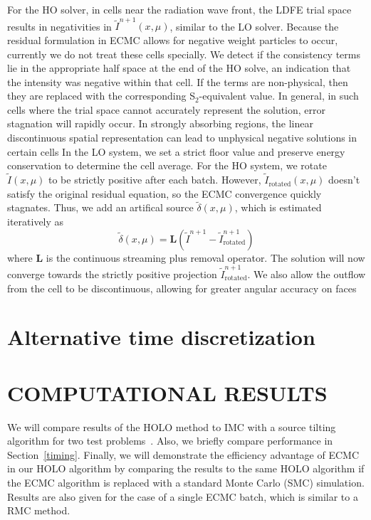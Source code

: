 \documentclass[11pt]{article}
\begin{document}
For the HO solver, in cells near the radiation wave front, the LDFE trial space results in negativities in
$\tilde{I}^{n+1}(x,\mu)$, similar to the LO solver.  Because the residual formulation in ECMC allows for negative weight
particles to occur, currently we do not treat these cells specially.  We detect if
the consistency terms lie in the appropriate half space at the end of the HO solve,
an indication that the intensity was negative within that cell.  If the terms are non-physical, then
they are replaced with the corresponding S$_2$-equivalent value. In general,
in such cells where the trial space cannot accurately represent the solution, error stagnation will
rapidly occur. 
             In strongly absorbing regions, the linear discontinuous spatial
                representation can lead to unphysical negative solutions in certain cells
             In the LO system,  we set a strict floor value and preserve energy
                conservation to determine the cell average.
            For the HO system, we rotate $\tilde{I}(x,\mu)$ to be strictly positive after
                each batch. However, $\tilde{I}_{\text{rotated}}(x,\mu)$ doesn't satisfy
                the original residual equation, so the ECMC convergence quickly
                stagnates.  Thus, we add an artifical source
                $\tilde\delta(x,\mu)$, which is 
                estimated iteratively as
                \begin{equation*}
                    \tilde\delta(x,\mu) = \mathbf{L}(\tilde{I}^{n+1} -
                    \tilde{I}^{n+1}_{\text{rotated}})
                \end{equation*}
                where $\mathbf{L}$ is the continuous streaming plus removal operator. The solution will now converge 
                towards the strictly positive projection $\tilde{I}_{\text{rotated}}^{n+1}$.
             We also allow the outflow from the cell to be discontinuous, allowing for greater angular accuracy on faces


\section{Alternative time discretization}
\label{sec:time}




\section{COMPUTATIONAL RESULTS}

We will compare results of the HOLO method to IMC with
a source tilting algorithm for two test problems~\cite{jayenne}.  
Also, we briefly compare performance in Section~\ref{timing}.
Finally,  we will demonstrate the efficiency advantage of ECMC in our HOLO
algorithm by comparing the results to the same HOLO algorithm if the ECMC algorithm
is replaced with a standard Monte Carlo (SMC) simulation.  Results are also given for
the case of a single ECMC batch, which is similar to a RMC method.
\end{document}
